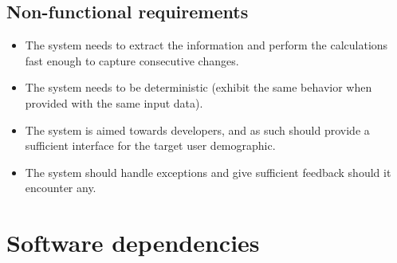 \documentclass[12pt]{report}
\theoremstyle{definition}
\theoremstyle{remark}
\begin{document}
\subsection{Non-functional requirements}
\begin{itemize}
    \item The system needs to extract the information and perform the calculations fast enough to capture consecutive changes.
    \item The system needs to be deterministic (exhibit the same behavior when provided with the same input data).
    \item The system is aimed towards developers, and as such should provide a sufficient interface for the target user demographic.
    \item The system should handle exceptions and give sufficient feedback should it encounter any.
\end{itemize}

\section{Software dependencies}
\end{document}
